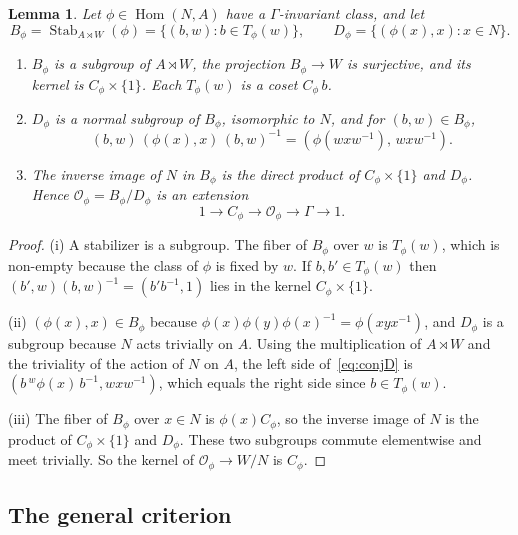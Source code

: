 \documentclass[12pt,letterpaper]{article}
\numberwithin{equation}{section}
\theoremstyle{plain}
\newtheorem{lemma}[theorem]{Lemma}
\theoremstyle{definition}
\newcommand{\act}[2]{{}^{#1}\!#2}          %
\DeclareMathOperator{\Hom}{Hom}
\DeclareMathOperator{\Stab}{Stab}
\begin{document}
\begin{lemma}\label{lem:BD}
Let $\phi\in\Hom(N,A)$ have a $\Gamma$-invariant class, and let
\[
B_\phi=\Stab_{A\rtimes W}(\phi)=\{(b,w):b\in T_\phi(w)\},\qquad
D_\phi=\{(\phi(x),x):x\in N\}.
\]
\begin{enumerate}[label=\textup{(\roman*)},itemsep=1pt]
\item $B_\phi$ is a subgroup of $A\rtimes W$, the projection
$B_\phi\to W$ is surjective, and its kernel is $C_\phi\times\{1\}$. Each
$T_\phi(w)$ is a coset $C_\phi\,b$.
\item $D_\phi$ is a normal subgroup of $B_\phi$, isomorphic to $N$, and
for $(b,w)\in B_\phi$,
\begin{equation}\label{eq:conjD}
(b,w)\,(\phi(x),x)\,(b,w)^{-1}=(\phi(wxw^{-1}),\,wxw^{-1}).
\end{equation}
\item The inverse image of $N$ in $B_\phi$ is the direct product of
$C_\phi\times\{1\}$ and $D_\phi$. Hence
$\mathcal{O}_\phi=B_\phi/D_\phi$ is an extension
\[
1\longrightarrow C_\phi\longrightarrow\mathcal{O}_\phi\longrightarrow
\Gamma\longrightarrow1 .
\]
\end{enumerate}
\end{lemma}

\begin{proof}
(i) A stabilizer is a subgroup. The fiber of $B_\phi$ over $w$ is
$T_\phi(w)$, which is non-empty because the class of $\phi$ is fixed by
$w$. If $b,b'\in T_\phi(w)$ then $(b',w)(b,w)^{-1}=(b'b^{-1},1)$ lies in
the kernel $C_\phi\times\{1\}$.

(ii) $(\phi(x),x)\in B_\phi$ because
$\phi(x)\phi(y)\phi(x)^{-1}=\phi(xyx^{-1})$, and $D_\phi$ is a subgroup
because $N$ acts trivially on $A$. Using the multiplication of
$A\rtimes W$ and the triviality of the action of $N$ on $A$, the left side
of~\eqref{eq:conjD} is $(b\,\act{w}{\phi(x)}\,b^{-1},wxw^{-1})$, which
equals the right side since $b\in T_\phi(w)$.

(iii) The fiber of $B_\phi$ over $x\in N$ is $\phi(x)C_\phi$, so the
inverse image of $N$ is the product of $C_\phi\times\{1\}$ and $D_\phi$.
These two subgroups commute elementwise and meet trivially. So the kernel
of $\mathcal{O}_\phi\to W/N$ is $C_\phi$.
\end{proof}

\subsection{The general criterion}
\end{document}

